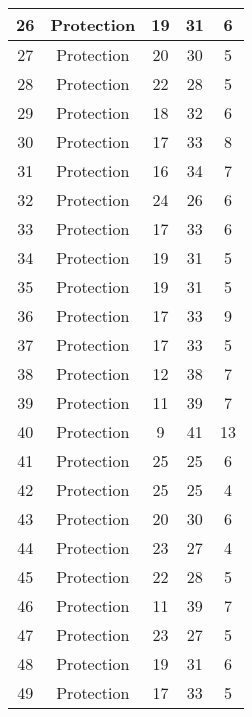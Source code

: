 \documentclass[results.tex]{subfiles}
\begin{document}
\begin{center}
\begin{tabular}{| c || c | c | c | c |}
    \hline
    26 & Protection & 19 & 31 & 6 \\ 
    \hline
    27 & Protection & 20 & 30 & 5 \\ 
    \hline
    28 & Protection & 22 & 28 & 5 \\ 
    \hline
    29 & Protection & 18 & 32 & 6 \\ 
    \hline
    30 & Protection & 17 & 33 & 8 \\ 
    \hline
    31 & Protection & 16 & 34 & 7 \\ 
    \hline
    32 & Protection & 24 & 26 & 6 \\ 
    \hline
    33 & Protection & 17 & 33 & 6 \\ 
    \hline
    34 & Protection & 19 & 31 & 5 \\ 
    \hline
    35 & Protection & 19 & 31 & 5 \\ 
    \hline
    36 & Protection & 17 & 33 & 9 \\ 
    \hline
    37 & Protection & 17 & 33 & 5 \\ 
    \hline
    38 & Protection & 12 & 38 & 7 \\ 
    \hline
    39 & Protection & 11 & 39 & 7 \\ 
    \hline
    40 & Protection & 9 & 41 & 13 \\ 
    \hline
    41 & Protection & 25 & 25 & 6 \\ 
    \hline
    42 & Protection & 25 & 25 & 4 \\ 
    \hline
    43 & Protection & 20 & 30 & 6 \\ 
    \hline
    44 & Protection & 23 & 27 & 4 \\ 
    \hline
    45 & Protection & 22 & 28 & 5 \\ 
    \hline
    46 & Protection & 11 & 39 & 7 \\ 
    \hline
    47 & Protection & 23 & 27 & 5 \\ 
    \hline
    48 & Protection & 19 & 31 & 6 \\ 
    \hline
    49 & Protection & 17 & 33 & 5 \\ 
    \hline   \end{tabular}
\end{center}
\end{document}

